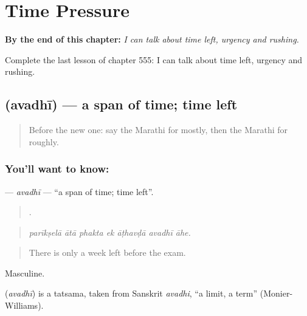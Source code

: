 
\chapter{Time Pressure}
\label{ch:mr-time-pressure}

\begin{chapteropening}
\textbf{By the end of this chapter:} \emph{I can talk about time left, urgency and rushing.}

Complete the last lesson of chapter 555: I can talk about time left, urgency and rushing.
\end{chapteropening}

\section[\texorpdfstring{\mr{अवधी} (avadhī)}{अवधी (avadhī)}]{ (avadhī) — a span of time; time left}

\label{lesson:MR-C555-avadhi}



\begin{quote}
Before the new one: say the Marathi for mostly, then the Marathi for roughly.
\end{quote}

\subsection*{You'll want to know: }
\textbf{} — \emph{avadhī} — \textquotedblleft{}a span of time; time left\textquotedblright{}.

\begin{quote}
      .
\end{quote}

\begin{quote}
\emph{parīkṣelā ātā phakta ek āṭhavḍā avadhī āhe.}
\end{quote}

\begin{quote}
There is only a week left before the exam.
\end{quote}

Masculine.

\begin{cousinweb}
\textbf{} (\emph{avadhī}) is a tatsama, taken from Sanskrit \emph{avadhi}, \textquotedblleft{}a limit, a term\textquotedblright{} (Monier-Williams).
\end{cousinweb}

